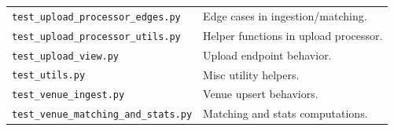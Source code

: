 \begin{longtable}{p{}p{}}
\texttt{test\_upload\_processor\_edges.py} & Edge cases in ingestion/matching. \\
\texttt{test\_upload\_processor\_utils.py} & Helper functions in upload processor. \\
\texttt{test\_upload\_view.py} & Upload endpoint behavior. \\
\texttt{test\_utils.py} & Misc utility helpers. \\
\texttt{test\_venue\_ingest.py} & Venue upsert behaviors. \\
\texttt{test\_venue\_matching\_and\_stats.py} & Matching and stats computations. \\
\bottomrule
\end{longtable}

